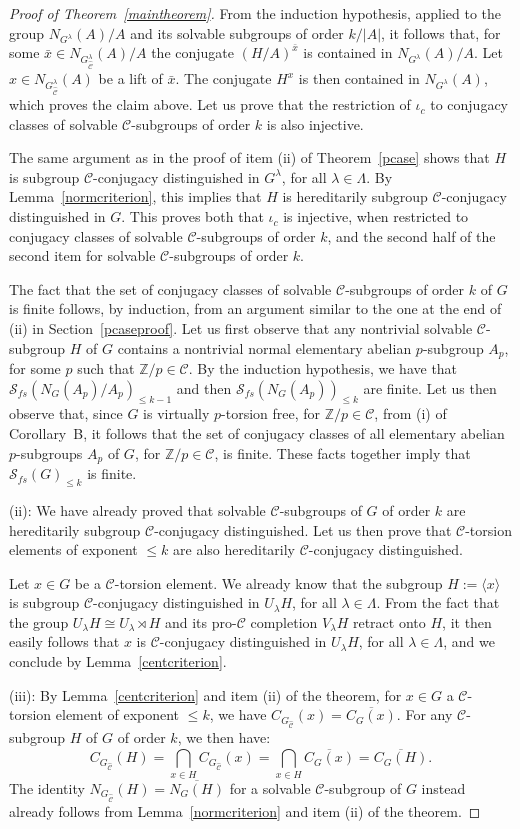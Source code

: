 \documentclass[12pt,twoside]{amsart}
\newcommand\la{\langle}
\newcommand\ra{\rangle}
\newcommand\Z{{\mathbb Z}}
\newcommand\ol{\overline}
\newcommand\cC{{\mathscr C}}
\newcommand\cS{{\mathscr S}}
\newcommand\ld{\lambda}
\newcommand\Ld{\Lambda}
\def\wC{{\widehat{\cC}}}
\theoremstyle{definition}
\begin{document}
\begin{proof}[Proof of Theorem~\ref{maintheorem}]
From the induction hypothesis, applied to the group $N_{G^\ld}(A)/A$ and its solvable subgroups of order $k/|A|$, it follows that, for some 
$\bar x\in N_{G_\wC^\ld}(A)/A$ the conjugate $(H/A)^{\bar x}$ is contained in $N_{G^\ld}(A)/A$. Let $x\in N_{G_\wC^\ld}(A)$ be a lift of $\bar x$. 
The conjugate $H^x$ is then contained in $N_{G^\ld}(A)$, which proves the claim above. Let us prove that the restriction of $\iota_c$
 to conjugacy classes of solvable $\cC$-subgroups of order $k$ is also injective.
 
The same argument as in the proof of item (ii) of Theorem~\ref{pcase} shows that $H$ is subgroup $\cC$-conjugacy distinguished in $G^\ld$,
for all $\ld\in\Ld$. By Lemma~\ref{normcriterion}, this implies that $H$ is hereditarily subgroup $\cC$-conjugacy distinguished in $G$. This proves
both that $\iota_c$ is injective, when restricted to conjugacy classes of solvable $\cC$-subgroups of order $k$, and the second half of the 
second item for solvable $\cC$-subgroups of order $k$. 

The fact that the set of conjugacy classes of solvable $\cC$-subgroups of order $k$ of $G$ is finite follows, by induction, from an argument similar to the one
at the end of (ii) in Section~\ref{pcaseproof}. Let us first observe that any nontrivial solvable $\cC$-subgroup $H$ of $G$ contains a nontrivial normal 
elementary abelian $p$-subgroup $A_p$, for some $p$ such that $\Z/p\in\cC$. By the induction hypothesis, we have that 
$\cS_{f\!s}(N_G(A_p)/A_p)_{\leq k-1}$ and then $\cS_{f\!s}(N_G(A_p))_{\leq k}$ are finite. Let us then observe that, since $G$ 
is virtually $p$-torsion free, for $\Z/p\in\cC$, from (i) of Corollary~B, it follows that the set of conjugacy classes of all elementary abelian 
$p$-subgroups $A_p$ of $G$, for $\Z/p\in\cC$, is finite. These facts together imply that $\cS_{f\!s}(G)_{\leq k}$ is finite.
\smallskip

\noindent
(ii): We have already proved that solvable $\cC$-subgroups of $G$ of order $k$ are hereditarily subgroup $\cC$-conjugacy distinguished. 
Let us then prove that $\cC$-torsion elements of exponent $\leq k$ are also hereditarily $\cC$-conjugacy distinguished. 

Let $x\in G$ be a $\cC$-torsion element. We already know that the subgroup $H:=\la x\ra$ is subgroup 
$\cC$-conjugacy distinguished in $U_\ld H$, for all $\ld\in\Ld$. From the fact that the group $U_\ld H\cong U_\ld\rtimes H$ 
and its pro-$\cC$ completion $V_\ld H$ retract onto $H$, it then easily follows that $x$ is $\cC$-conjugacy distinguished 
in $U_\ld H$, for all $\ld\in\Ld$, and we conclude by Lemma~\ref{centcriterion}.
\smallskip

\noindent
(iii): By Lemma~\ref{centcriterion} and item (ii) of the theorem, for $x\in G$ a $\cC$-torsion element of exponent $\leq k$, 
we have $C_{G_\wC}(x)=\ol{C_G(x)}$. For any $\cC$-subgroup $H$ of $G$ of order $k$, we then have: 
\[C_{G_\wC}(H)=\bigcap_{x\in H}C_{G_\wC}(x)=\bigcap_{x\in H}\ol{C_G(x)}=\ol{C_G(H)}.\]
The identity $N_{G_\wC}(H)=\ol{N_G(H)}$ for a solvable $\cC$-subgroup of $G$ instead already follows from Lemma~\ref{normcriterion}
and item (ii) of the theorem.
\end{proof}
\end{document}

